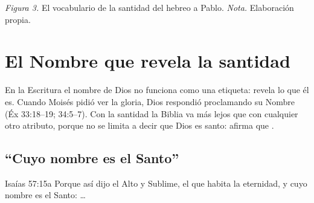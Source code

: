 \begin{center}
\par
{\footnotesize\color{gris}\textit{Figura 3.} El vocabulario de la santidad del hebreo a Pablo. \textit{Nota.} Elaboración propia.}
\end{center}

\section{El Nombre que revela la santidad}

En la Escritura el nombre de Dios no funciona como una etiqueta: revela lo que él es. Cuando Moisés pidió ver la gloria, Dios respondió proclamando su Nombre (Éx 33:18--19; 34:5--7). Con la santidad la Biblia va más lejos que con cualquier otro atributo, porque no se limita a decir que Dios es santo: afirma que .

\subsection{“Cuyo nombre es el Santo”}
\begin{verso}{Isaías 57:15a}
Porque así dijo el Alto y Sublime, el que habita la eternidad, y cuyo nombre es el Santo: \ldots
\end{verso}

